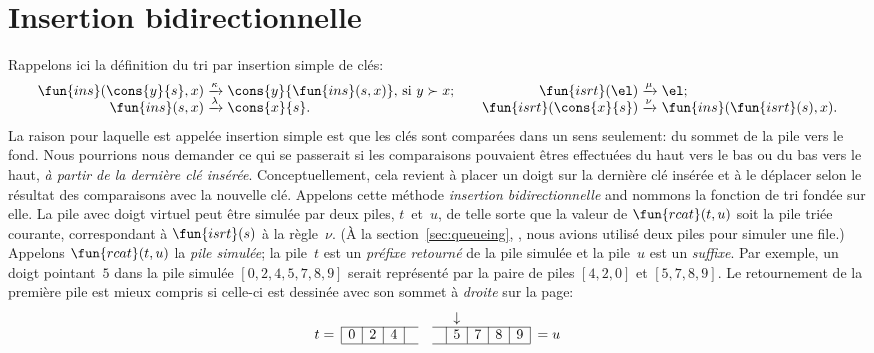 \section{Insertion bidirectionnelle}
\label{sec:2-way}

Rappelons ici la définition du tri par insertion simple de clés:
\begin{equation*}
\begin{array}{@{}r@{\;}l@{\;}l@{\qquad}r@{\;}l@{\;}l@{}}
  \fun{ins}(\cons{y}{s},x)
& \xrightarrow{\smash{\kappa}}
& \cons{y}{\fun{ins}(s,x)}, \,\text{si \(y \succ x\)};
& \fun{isrt}(\el)
& \xrightarrow{\smash{\mu}}
& \el;\\
  \fun{ins}(s,x)
& \xrightarrow{\smash{\lambda}}
& \cons{x}{s}.
& \fun{isrt}(\cons{x}{s})
& \xrightarrow{\smash{\nu}}
& \fun{ins}(\fun{isrt}(s),x).
\end{array}
\end{equation*}
La raison pour laquelle  est appelée
insertion simple est que les clés sont comparées dans un sens
seulement: du sommet de la pile vers le fond. Nous pourrions nous
demander ce qui se passerait si les comparaisons pouvaient êtres
effectuées du haut vers le bas ou du bas vers le haut, \emph{à partir
  de la dernière clé insérée}. Conceptuellement, cela revient à placer
un doigt sur la dernière clé insérée et à le déplacer selon le
résultat des comparaisons avec la nouvelle clé. Appelons cette méthode
\emph{insertion bidirectionnelle} and nommons
 la fonction de tri fondée sur
elle. La pile avec doigt virtuel peut être simulée par deux piles,
\(t\)~et~\(u\), de telle sorte que la valeur de
\(\fun{rcat}(t,u)\) soit la pile triée
courante, correspondant à \(\fun{isrt}(s)\) à
la règle~\(\nu\). (À la section~\ref{sec:queueing},
, nous avions utilisé deux piles pour simuler
une file.) Appelons \(\fun{rcat}(t,u)\) la
\emph{pile simulée}; la pile~\(t\) est un
\emph{préfixe retourné} de la pile
simulée et la pile~\(u\) est un
\emph{suffixe}. Par exemple, un doigt
pointant~\(5\) dans la pile simulée \([0,2,4,5,7,8,9]\) serait
représenté par la paire de piles \([4,2,0]\) et \([5,7,8,9]\). Le
retournement de la première pile est mieux compris si celle-ci est
dessinée avec son sommet à \emph{droite} sur la page:
\begin{equation*}
\abovedisplayskip=0pt
\begin{array}{@{}r|c|c|c|ccc|c|c|c|c|l@{}}
  \multicolumn{1}{c}{} & \multicolumn{1}{c}{} & \multicolumn{1}{c}{}
& \multicolumn{1}{c}{} & \multicolumn{1}{c}{} & \multicolumn{1}{c}{}
& \multicolumn{1}{c}{} & \multicolumn{1}{c}{\downarrow}\\
\cline{2-5}\cline{7-11}
t = & 0 & 2 & 4 & & & & 5 & 7 & 8 & 9 & = u\\
\cline{2-5}\cline{7-11}
\end{array}
\end{equation*}
